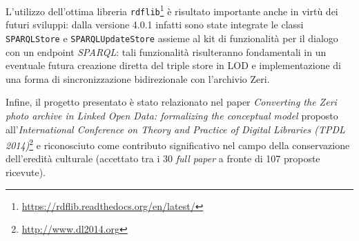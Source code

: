 L'utilizzo dell'ottima libreria \texttt{rdflib}\footnote{\url{https://rdflib.readthedocs.org/en/latest/}} è risultato importante anche in virtù dei futuri sviluppi: dalla versione 4.0.1 infatti sono state integrate le classi \texttt{SPARQLStore} e \texttt{SPARQLUpdateStore} assieme al kit di funzionalità per il dialogo con un endpoint \emph{SPARQL}: tali funzionalità risulteranno fondamentali in un eventuale futura creazione diretta del triple store in LOD e implementazione di una forma di sincronizzazione bidirezionale con l'archivio Zeri.

Infine, il progetto presentato è stato relazionato nel paper \emph{Converting the Zeri photo archive in Linked Open Data: formalizing the conceptual model} \cite{29} proposto all'\emph{International Conference on Theory and Practice of Digital Libraries (TPDL 2014)}\footnote{\url{http://www.dl2014.org}} e riconosciuto come contributo significativo nel campo della conservazione dell'eredità culturale (accettato tra i 30 \emph{full paper} a fronte di 107 proposte ricevute).
